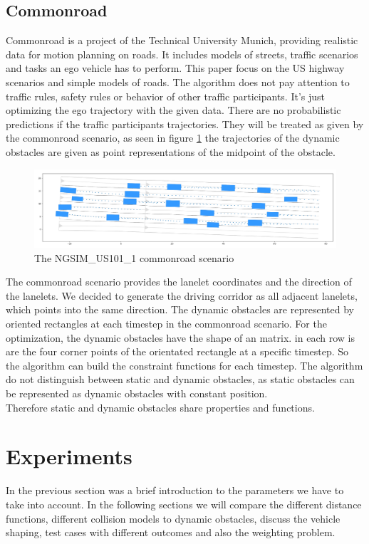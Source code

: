 \documentclass[conference]{IEEEtran}
\begin{document}
\subsection{Commonroad}
Commonroad is a project of the Technical University Munich, providing realistic data for motion planning on roads. It includes models of streets, traffic scenarios and tasks an ego vehicle has to perform. This paper focus on the US highway scenarios and simple models of roads. 
The algorithm does not pay attention to traffic rules, safety rules or behavior of other traffic participants. It's just optimizing the ego trajectory with the given data. There are no probabilistic predictions if the traffic participants trajectories. They will be treated as given by the commonroad scenario, as seen in figure \ref{CRT} the trajectories of the dynamic obstacles are given as point representations of the midpoint of the obstacle.
\begin{figure}[h]
\begin{center}
\includegraphics[scale = 0.15]{commonroadUS28.png}
\end{center}
\caption{The NGSIM\_US101\_1 commonroad scenario}
\label{CRT}
\end{figure}

The commonroad scenario provides the lanelet coordinates and the direction of the lanelets. We decided to generate the driving corridor as all adjacent lanelets, which points into the same direction. The dynamic obstacles are represented by oriented rectangles at each timestep in the commonroad scenario. For the optimization, the dynamic obstacles have the shape of an matrix. in each row is are the four corner points of the orientated rectangle at a specific timestep. So the algorithm can build the constraint functions for each timestep. The algorithm do not distinguish between static and dynamic obstacles, as static obstacles can be represented as dynamic obstacles with constant position.\\ Therefore static and dynamic obstacles share properties and functions.

\section{Experiments}
In the previous section was a brief introduction to the parameters we have to take into account. In the following sections we will compare the different distance functions, different collision models to dynamic obstacles, discuss the vehicle shaping, test cases with different outcomes and also the weighting problem.
\end{document}
